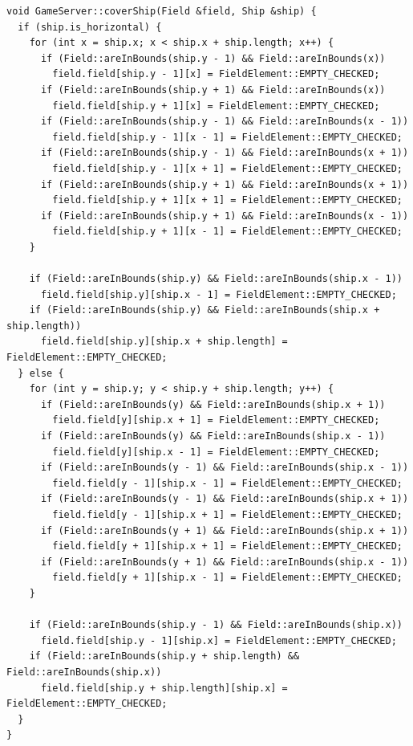 \documentclass[a4paper,14pt]{extarticle}
\begin{document}
\begin{verbatim}
void GameServer::coverShip(Field &field, Ship &ship) {
  if (ship.is_horizontal) {
    for (int x = ship.x; x < ship.x + ship.length; x++) {
      if (Field::areInBounds(ship.y - 1) && Field::areInBounds(x))
        field.field[ship.y - 1][x] = FieldElement::EMPTY_CHECKED;
      if (Field::areInBounds(ship.y + 1) && Field::areInBounds(x))
        field.field[ship.y + 1][x] = FieldElement::EMPTY_CHECKED;
      if (Field::areInBounds(ship.y - 1) && Field::areInBounds(x - 1))
        field.field[ship.y - 1][x - 1] = FieldElement::EMPTY_CHECKED;
      if (Field::areInBounds(ship.y - 1) && Field::areInBounds(x + 1))
        field.field[ship.y - 1][x + 1] = FieldElement::EMPTY_CHECKED;
      if (Field::areInBounds(ship.y + 1) && Field::areInBounds(x + 1))
        field.field[ship.y + 1][x + 1] = FieldElement::EMPTY_CHECKED;
      if (Field::areInBounds(ship.y + 1) && Field::areInBounds(x - 1))
        field.field[ship.y + 1][x - 1] = FieldElement::EMPTY_CHECKED;
    }

    if (Field::areInBounds(ship.y) && Field::areInBounds(ship.x - 1))
      field.field[ship.y][ship.x - 1] = FieldElement::EMPTY_CHECKED;
    if (Field::areInBounds(ship.y) && Field::areInBounds(ship.x + ship.length))
      field.field[ship.y][ship.x + ship.length] = FieldElement::EMPTY_CHECKED;
  } else {
    for (int y = ship.y; y < ship.y + ship.length; y++) {
      if (Field::areInBounds(y) && Field::areInBounds(ship.x + 1))
        field.field[y][ship.x + 1] = FieldElement::EMPTY_CHECKED;
      if (Field::areInBounds(y) && Field::areInBounds(ship.x - 1))
        field.field[y][ship.x - 1] = FieldElement::EMPTY_CHECKED;
      if (Field::areInBounds(y - 1) && Field::areInBounds(ship.x - 1))
        field.field[y - 1][ship.x - 1] = FieldElement::EMPTY_CHECKED;
      if (Field::areInBounds(y - 1) && Field::areInBounds(ship.x + 1))
        field.field[y - 1][ship.x + 1] = FieldElement::EMPTY_CHECKED;
      if (Field::areInBounds(y + 1) && Field::areInBounds(ship.x + 1))
        field.field[y + 1][ship.x + 1] = FieldElement::EMPTY_CHECKED;
      if (Field::areInBounds(y + 1) && Field::areInBounds(ship.x - 1))
        field.field[y + 1][ship.x - 1] = FieldElement::EMPTY_CHECKED;
    }

    if (Field::areInBounds(ship.y - 1) && Field::areInBounds(ship.x))
      field.field[ship.y - 1][ship.x] = FieldElement::EMPTY_CHECKED;
    if (Field::areInBounds(ship.y + ship.length) && Field::areInBounds(ship.x))
      field.field[ship.y + ship.length][ship.x] = FieldElement::EMPTY_CHECKED;
  }
}

\end{verbatim}
\end{document}
